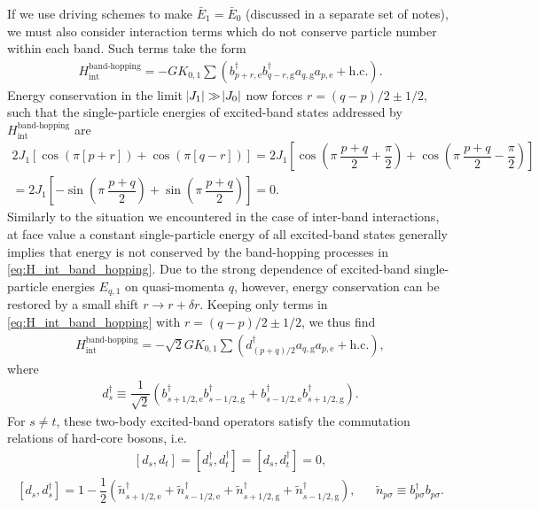 \documentclass[aps,notitlepage,nofootinbib,11pt]{revtex4-1}
\renewcommand{\t}{\text} %
\newcommand{\f}[2]{\dfrac{#1}{#2}} %
\newcommand{\p}[1]{\left(#1\right)} %
\renewcommand{\sp}[1]{\left[#1\right]} %
\newcommand{\1}{\mathds{1}}
\newcommand{\g}{\text{g}}
\newcommand{\e}{\text{e}}
\begin{document}
If we use driving schemes to make $\bar E_1=\bar E_0$ (discussed in a
separate set of notes), we must also consider interaction terms which
do not conserve particle number within each band.  Such terms take the
form
\begin{align}
  H_{\t{int}}^{\t{band-hopping}} = - G K_{0,1}
  \sum \p{b_{p+r,\e}^\dag b_{q-r,\g}^\dag a_{q,\g} a_{p,\e} + \t{h.c.}}.
  \label{eq:H_int_band_hopping}
\end{align}
Energy conservation in the limit $\abs{J_1}\gg\abs{J_0}$ now forces
$r=\p{q-p}/2\pm1/2$, such that the single-particle energies of
excited-band states addressed by $H_{\t{int}}^{\t{band-hopping}}$ are
\begin{multline}
  2J_1\sp{\cos\p{\pi\sp{p+r}} + \cos\p{\pi\sp{q-r}}}
  = 2J_1\sp{\cos\p{\pi~\f{p+q}{2}+\f{\pi}{2}}
    + \cos\p{\pi~\f{p+q}{2}-\f{\pi}{2}}} \\
  = 2J_1\sp{-\sin\p{\pi~\f{p+q}{2}} + \sin\p{\pi~\f{p+q}{2}}}
  = 0.
\end{multline}
Similarly to the situation we encountered in the case of inter-band
interactions, at face value a constant single-particle energy of all
excited-band states generally implies that energy is not conserved by
the band-hopping processes in \eqref{eq:H_int_band_hopping}.  Due to
the strong dependence of excited-band single-particle energies
$E_{q,1}$ on quasi-momenta $q$, however, energy conservation can be
restored by a small shift $r\to r+\delta r$.  Keeping only terms in
\eqref{eq:H_int_band_hopping} with $r=\p{q-p}/2\pm1/2$, we thus find
\begin{align}
  H_{\t{int}}^{\t{band-hopping}}
  = - \sqrt{2} G K_{0,1} \sum
  \p{d_{\p{p+q}/2}^\dag a_{q,\g} a_{p,\e} + \t{h.c.}},
\end{align}
where
\begin{align}
  d_s^\dag \equiv \f1{\sqrt2}
  \p{b_{s+1/2,\e}^\dag b_{s-1/2,\g}^\dag
    + b_{s-1/2,\e}^\dag b_{s+1/2,\g}^\dag}.
\end{align}
For $s\ne t$, these two-body excited-band operators satisfy the
commutation relations of hard-core bosons, i.e.
\begin{align}
  \sp{d_s, d_t} = \sp{d_s^\dag, d_t^\dag} = \sp{d_s, d_t^\dag} = 0,
\end{align}
\begin{align}
  \sp{d_s, d_s^\dag}
  = 1 - \f12 \p{\tilde n_{s+1/2,\e}^\dag + \tilde n_{s-1/2,\e}^\dag
    + \tilde n_{s+1/2,\g}^\dag + \tilde n_{s-1/2,\g}^\dag},
  &&
  \tilde n_{p\sigma} \equiv b_{p\sigma}^\dag b_{p\sigma}.
\end{align}
\end{document}
